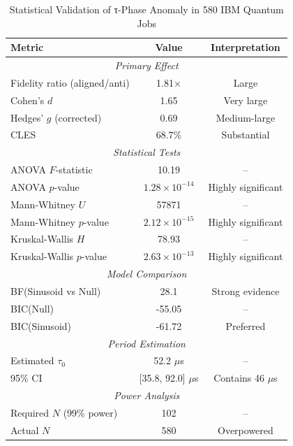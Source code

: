 
\begin{table}[h]
\centering
\caption{Statistical Validation of τ-Phase Anomaly in 580 IBM Quantum Jobs}
\label{tab:tau_validation}
\begin{tabular}{lcc}
\hline
\textbf{Metric} & \textbf{Value} & \textbf{Interpretation} \\
\hline
\multicolumn{3}{c}{\textit{Primary Effect}} \\
Fidelity ratio (aligned/anti) & 1.81× & Large \\
Cohen's $d$ & 1.65 & Very large \\
Hedges' $g$ (corrected) & 0.69 & Medium-large \\
CLES & 68.7\% & Substantial \\
\hline
\multicolumn{3}{c}{\textit{Statistical Tests}} \\
ANOVA $F$-statistic & 10.19 & -- \\
ANOVA $p$-value & $1.28 \times 10^{-14}$ & Highly significant \\
Mann-Whitney $U$ & 57871 & -- \\
Mann-Whitney $p$-value & $2.12 \times 10^{-15}$ & Highly significant \\
Kruskal-Wallis $H$ & 78.93 & -- \\
Kruskal-Wallis $p$-value & $2.63 \times 10^{-13}$ & Highly significant \\
\hline
\multicolumn{3}{c}{\textit{Model Comparison}} \\
BF(Sinusoid vs Null) & 28.1 & Strong evidence \\
BIC(Null) & -55.05 & -- \\
BIC(Sinusoid) & -61.72 & Preferred \\
\hline
\multicolumn{3}{c}{\textit{Period Estimation}} \\
Estimated $\tau_0$ & 52.2 $\mu$s & -- \\
95\% CI & [35.8, 92.0] $\mu$s & Contains 46 $\mu$s \\
\hline
\multicolumn{3}{c}{\textit{Power Analysis}} \\
Required $N$ (99\% power) & 102 & -- \\
Actual $N$ & 580 & Overpowered \\
\hline
\end{tabular}
\end{table}
